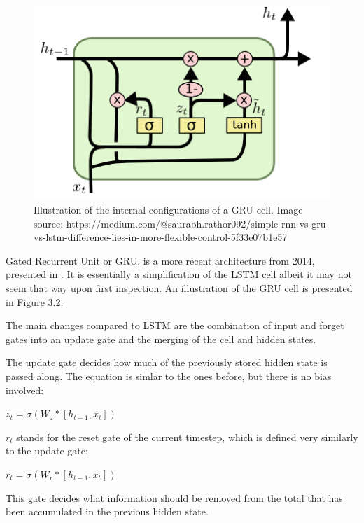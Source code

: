 \documentclass[bsc,frontabs,singlespacing,parskip,deptreport]{infthesis}
\begin{document}
\begin{figure}
\centering
\includegraphics[width = 6in]{gru}
\setlength{\belowcaptionskip}{0pt}
\caption{Illustration of the internal configurations of a GRU cell. Image source: https://medium.com/@saurabh.rathor092/simple-rnn-vs-gru-vs-lstm-difference-lies-in-more-flexible-control-5f33e07b1e57}
\label{gru}
\vskip -5mm
\end{figure}

Gated Recurrent Unit or GRU, is a more recent architecture from 2014, presented in \cite{gru}. It is essentially a simplification of the LSTM cell albeit it may not seem that way upon first inspection. An illustration of the GRU cell is presented in Figure 3.2.

The main changes compared to LSTM are the combination of input and forget gates into an update gate and the merging of the cell and hidden states.

The update gate decides how much of the previously stored hidden state is passed along. The equation is simlar to the ones before, but there is no bias involved:

\begin{center}
$ z_t = \sigma(W_z*[h_{t-1},x_t]) $
\end{center}

$ r_t $ stands for the reset gate of the current timestep, which is defined very similarly to the update gate:

\begin{center}
$ r_t = \sigma(W_r*[h_{t-1}, x_t]) $
\end{center}

This gate decides what information should be removed from the total that has been accumulated in the previous hidden state.
\end{document}
